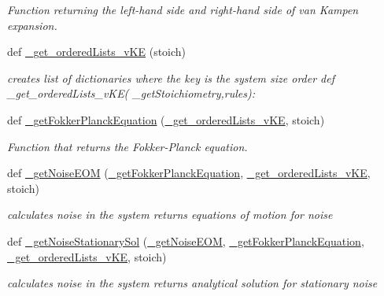 \begin{DoxyCompactItemize}
\begin{DoxyCompactList}\small\item\em Function returning the left-\/hand side and right-\/hand side of van Kampen expansion. \end{DoxyCompactList}\item 
def \hyperlink{namespace_mu_mo_t_1_1_mu_mo_t_aa4d9e72bb9834df8dc09115a251c1973}{\+\_\+get\+\_\+ordered\+Lists\+\_\+v\+KE} (stoich)
\begin{DoxyCompactList}\small\item\em creates list of dictionaries where the key is the system size order def \+\_\+get\+\_\+ordered\+Lists\+\_\+v\+K\+E( \+\_\+get\+Stoichiometry,rules)\+: \end{DoxyCompactList}\item 
def \hyperlink{namespace_mu_mo_t_1_1_mu_mo_t_af4a11defe964c17a082b91a97f7f8034}{\+\_\+get\+Fokker\+Planck\+Equation} (\hyperlink{namespace_mu_mo_t_1_1_mu_mo_t_aa4d9e72bb9834df8dc09115a251c1973}{\+\_\+get\+\_\+ordered\+Lists\+\_\+v\+KE}, stoich)
\begin{DoxyCompactList}\small\item\em Function that returns the Fokker-\/\+Planck equation. \end{DoxyCompactList}\item 
def \hyperlink{namespace_mu_mo_t_1_1_mu_mo_t_af8a8a57c2a7c5fc2a4b0a97a8db1fb8d}{\+\_\+get\+Noise\+E\+OM} (\hyperlink{namespace_mu_mo_t_1_1_mu_mo_t_af4a11defe964c17a082b91a97f7f8034}{\+\_\+get\+Fokker\+Planck\+Equation}, \hyperlink{namespace_mu_mo_t_1_1_mu_mo_t_aa4d9e72bb9834df8dc09115a251c1973}{\+\_\+get\+\_\+ordered\+Lists\+\_\+v\+KE}, stoich)
\begin{DoxyCompactList}\small\item\em calculates noise in the system returns equations of motion for noise \end{DoxyCompactList}\item 
def \hyperlink{namespace_mu_mo_t_1_1_mu_mo_t_a7bc4299a5e34403a5053afd4b043a0c3}{\+\_\+get\+Noise\+Stationary\+Sol} (\hyperlink{namespace_mu_mo_t_1_1_mu_mo_t_af8a8a57c2a7c5fc2a4b0a97a8db1fb8d}{\+\_\+get\+Noise\+E\+OM}, \hyperlink{namespace_mu_mo_t_1_1_mu_mo_t_af4a11defe964c17a082b91a97f7f8034}{\+\_\+get\+Fokker\+Planck\+Equation}, \hyperlink{namespace_mu_mo_t_1_1_mu_mo_t_aa4d9e72bb9834df8dc09115a251c1973}{\+\_\+get\+\_\+ordered\+Lists\+\_\+v\+KE}, stoich)
\begin{DoxyCompactList}\small\item\em calculates noise in the system returns analytical solution for stationary noise \end{DoxyCompactList}\item 

\end{DoxyCompactItemize}
